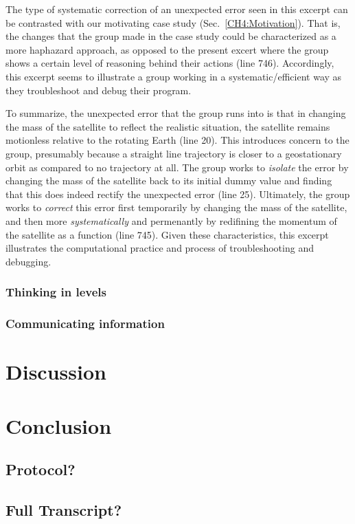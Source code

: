 \documentclass{msuphddissertation}
\begin{document}
\begin{doublespace}
The type of systematic correction of an unexpected error seen in this excerpt can be contrasted with our motivating case study (Sec.~\ref{CH4:Motivation}).  That is, the changes that the group made in the case study could be characterized as a more haphazard approach, as opposed to the present excert where the group shows a certain level of reasoning behind their actions (line 746).  Accordingly, this excerpt seems to illustrate a group working in a systematic/efficient way as they troubleshoot and debug their program.

To summarize, the unexpected error that the group runs into is that in changing the mass of the satellite to reflect the realistic situation, the satellite remains motionless relative to the rotating Earth (line 20).  This introduces concern to the group, presumably because a straight line trajectory is closer to a geostationary orbit as compared to no trajectory at all.  The group works to \textit{isolate} the error by changing the mass of the satellite back to its initial dummy value and finding that this does indeed rectify the unexpected error (line 25).  Ultimately, the group works to \textit{correct} this error first temporarily by changing the mass of the satellite, and then more \textit{systematically} and permenantly by redifining the momentum of the satellite as a function (line 745).  Given these characteristics, this excerpt illustrates the computational practice and process of troubleshooting and debugging.

\subsection{Thinking in levels}

\subsection{Communicating information}

%
%

\chapter{Discussion}\label{CH6:Discussion}


%
%

\chapter{Conclusion}\label{CH7:Conclusion}

%
%

\appendices\label{Appendix}

\section*{Protocol?}

\section*{Full Transcript?}

%
%

\end{doublespace}



\end{document}
